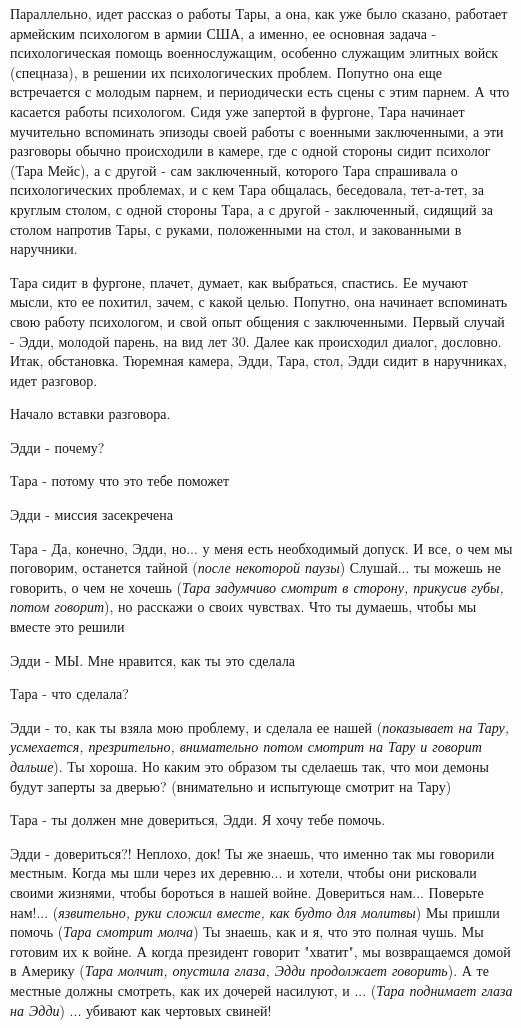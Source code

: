 Параллельно, идет рассказ о работы Тары, а она, как уже было сказано, работает
армейским психологом в армии США, а именно, ее основная задача -
психологическая помощь военнослужащим, особенно служащим элитных войск
(спецназа), в решении их психологических проблем. Попутно она еще встречается с
молодым парнем, и периодически есть сцены с этим парнем. А что касается работы
психологом. Сидя уже запертой в фургоне, Тара начинает мучительно вспоминать
эпизоды своей работы с военными заключенными, а эти разговоры обычно
происходили в камере, где с одной стороны сидит психолог (Тара Мейс), а с
другой - сам заключенный, которого Тара спрашивала о психологических проблемах,
и с кем Тара общалась, беседовала, тет-а-тет, за круглым столом, с одной
стороны Тара, а с другой - заключенный, сидящий за столом напротив Тары, с
руками, положенными на стол, и закованными в наручники.

Тара сидит в фургоне, плачет, думает, как выбраться, спастись. Ее мучают мысли,
кто ее похитил, зачем, с какой целью. Попутно, она начинает вспоминать свою
работу психологом, и свой опыт общения с заключенными. Первый случай - Эдди,
молодой парень, на вид лет 30.  Далее как происходил диалог, дословно. Итак,
обстановка. Тюремная камера, Эдди, Тара, стол, Эдди сидит в наручниках, идет
разговор.

Начало вставки разговора.

Эдди - почему?

Тара - потому что это тебе поможет

Эдди - миссия засекречена

Тара - Да, конечно, Эдди, но... у меня есть необходимый допуск. И все, о чем мы
поговорим, останется тайной (\emph{после некоторой паузы}) Слушай... ты можешь не
говорить, о чем не хочешь (\emph{Тара задумчиво смотрит в сторону, прикусив губы,
потом говорит}), но расскажи о своих чувствах. Что ты думаешь, чтобы мы вместе
это решили

Эдди - МЫ. Мне нравится, как ты это сделала

Тара - что сделала? 

Эдди - то, как ты взяла мою проблему, и сделала ее нашей (\emph{показывает на Тару,
усмехается, презрительно, внимательно потом смотрит на Тару и говорит дальше}).
Ты хороша. Но каким это образом ты сделаешь так, что мои демоны будут заперты
за дверью? (внимательно и испытующе смотрит на Тару)

Тара - ты должен мне довериться, Эдди. Я хочу тебе помочь. 

Эдди - довериться?! Неплохо, док! Ты же знаешь, что именно так мы говорили
местным. Когда мы шли через их деревню... и хотели, чтобы они рисковали своими
жизнями, чтобы бороться в нашей войне. Довериться нам...  Поверьте нам!...
(\emph{язвительно, руки сложил вместе, как будто для молитвы}) Мы пришли помочь
(\emph{Тара смотрит молча}) Ты знаешь, как и я, что это полная чушь. Мы готовим
их к войне. А когда президент говорит "хватит", мы возвращаемся домой в Америку
(\emph{Тара молчит, опустила глаза, Эдди продолжает говорить}). А те местные
должны смотреть, как их дочерей насилуют, и ... (\emph{Тара поднимает глаза на
Эдди}) ... убивают как чертовых свиней!

